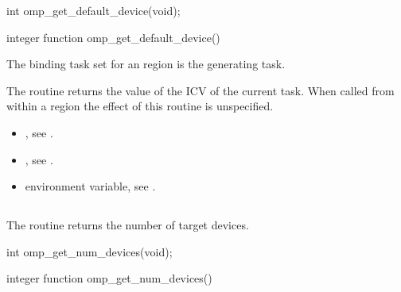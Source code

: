 \format
\begin{ccppspecific}
\begin{ompcFunction}
int omp_get_default_device(void);
\end{ompcFunction}
\end{ccppspecific}

\begin{fortranspecific}
\begin{ompfFunction}
integer function omp_get_default_device()
\end{ompfFunction}
\end{fortranspecific}

\binding
The binding task set for an  region 
is the generating task.

\effect
The  routine returns the value of the 
 ICV of the current task. When called from 
within a  region the effect of this routine is unspecified.

\crossreferences
\begin{itemize}
\item {}, see
.

\item {}, see
.

\item {} environment variable, see
.
\end{itemize}



\subsection{}
\label{subsec:omp_get_num_devices}
\summary
The  routine returns the number of target devices.

\format
\begin{ccppspecific}
\begin{ompcFunction}
int omp_get_num_devices(void);
\end{ompcFunction}
\end{ccppspecific}

\begin{fortranspecific}
\begin{ompfFunction}
integer function omp_get_num_devices()
\end{ompfFunction}
\end{fortranspecific}

